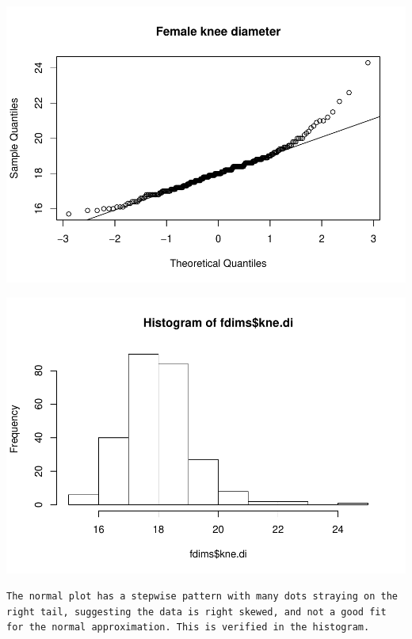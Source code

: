 \documentclass[]{article}
\newenvironment{Shaded}{\begin{snugshade}}{\end{snugshade}}
\newcommand{\KeywordTok}[1]{\textcolor[rgb]{0.13,0.29,0.53}{\textbf{{#1}}}}
\newcommand{\DataTypeTok}[1]{\textcolor[rgb]{0.13,0.29,0.53}{{#1}}}
\newcommand{\StringTok}[1]{\textcolor[rgb]{0.31,0.60,0.02}{{#1}}}
\newcommand{\NormalTok}[1]{{#1}}
\begin{document}
\begin{Shaded}
\end{Shaded}

\includegraphics{Lab_3_files/figure-latex/unnamed-chunk-7-1.pdf}

\begin{Shaded}
\end{Shaded}

\includegraphics{Lab_3_files/figure-latex/unnamed-chunk-7-2.pdf}

\begin{verbatim}
The normal plot has a stepwise pattern with many dots straying on the right tail, suggesting the data is right skewed, and not a good fit for the normal approximation. This is verified in the histogram.
\end{verbatim}
\end{document}
